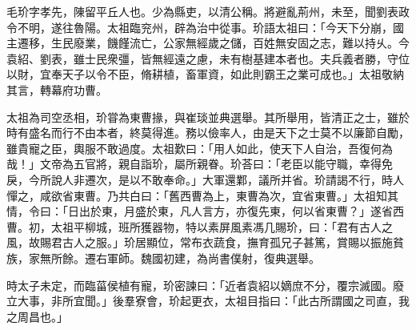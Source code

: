 \begin{pinyinscope}
 
 
 毛玠字孝先，陳留平丘人也。少為縣吏，以清公稱。將避亂荊州，未至，聞劉表政令不明，遂往魯陽。太祖臨兖州，辟為治中從事。玠語太祖曰：「今天下分崩，國主遷移，生民廢業，饑饉流亡，公家無經歲之儲，百姓無安固之志，難以持乆。今袁紹、劉表，雖士民衆彊，皆無經遠之慮，未有樹基建本者也。夫兵義者勝，守位以財，宜奉天子以令不臣，脩耕植，畜軍資，如此則霸王之業可成也。」太祖敬納其言，轉幕府功曹。
 
 
 
 
 太祖為司空丞相，玠甞為東曹掾，與崔琰並典選舉。其所舉用，皆清正之士，雖於時有盛名而行不由本者，終莫得進。務以儉率人，由是天下之士莫不以廉節自勵，雖貴寵之臣，輿服不敢過度。太祖歎曰：「用人如此，使天下人自治，吾復何為哉！」文帝為五官將，親自詣玠，屬所親眷。玠荅曰：「老臣以能守職，幸得免戾，今所說人非遷次，是以不敢奉命。」大軍還鄴，議所并省。玠請謁不行，時人憚之，咸欲省東曹。乃共白曰：「舊西曹為上，東曹為次，宜省東曹。」太祖知其情，令曰：「日出於東，月盛於東，凡人言方，亦復先東，何以省東曹？」遂省西曹。初，太祖平柳城，班所獲器物，特以素屏風素馮几賜玠，曰：「君有古人之風，故賜君古人之服。」玠居顯位，常布衣蔬食，撫育孤兄子甚篤，賞賜以振施貧族，家無所餘。遷右軍師。魏國初建，為尚書僕射，復典選舉。
 
 
 時太子未定，而臨菑侯植有寵，玠密諫曰：「近者袁紹以嫡庶不分，覆宗滅國。廢立大事，非所宜聞。」後羣寮會，玠起更衣，太祖目指曰：「此古所謂國之司直，我之周昌也。」
 

\end{pinyinscope}
